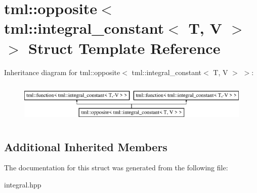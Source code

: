 \hypertarget{structtml_1_1opposite_3_01tml_1_1integral__constant_3_01T_00_01V_01_4_01_4}{\section{tml\+:\+:opposite$<$ tml\+:\+:integral\+\_\+constant$<$ T, V $>$ $>$ Struct Template Reference}
\label{structtml_1_1opposite_3_01tml_1_1integral__constant_3_01T_00_01V_01_4_01_4}
}
Inheritance diagram for tml\+:\+:opposite$<$ tml\+:\+:integral\+\_\+constant$<$ T, V $>$ $>$\+:\begin{figure}[H]
\begin{center}
\leavevmode
\includegraphics[height=2.000000cm]{structtml_1_1opposite_3_01tml_1_1integral__constant_3_01T_00_01V_01_4_01_4}
\end{center}
\end{figure}
\subsection*{Additional Inherited Members}


The documentation for this struct was generated from the following file\+:\begin{DoxyCompactItemize}
\item 
integral.\+hpp\end{DoxyCompactItemize}
